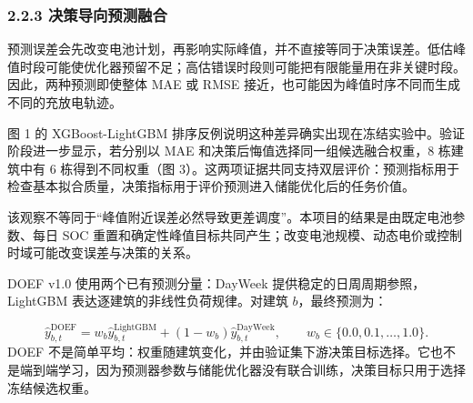 \documentclass[12pt,a4paper]{article}
\begin{document}
\subsubsection{2.2.3 决策导向预测融合}
预测误差会先改变电池计划，再影响实际峰值，并不直接等同于决策误差。低估峰值时段可能使优化器预留不足；高估错误时段则可能把有限能量用在非关键时段。因此，两种预测即使整体 MAE 或 RMSE 接近，也可能因为峰值时序不同而生成不同的充放电轨迹。\par
图 1 的 XGBoost-LightGBM 排序反例说明这种差异确实出现在冻结实验中。验证阶段进一步显示，若分别以 MAE 和决策后悔值选择同一组候选融合权重，8 栋建筑中有 6 栋得到不同权重（图 3）。这两项证据共同支持双层评价：预测指标用于检查基本拟合质量，决策指标用于评价预测进入储能优化后的任务价值。\par
该观察不等同于“峰值附近误差必然导致更差调度”。本项目的结果是由既定电池参数、每日 SOC 重置和确定性峰值目标共同产生；改变电池规模、动态电价或控制时域可能改变误差与决策的关系。\par
DOEF v1.0 使用两个已有预测分量：DayWeek 提供稳定的日周周期参照，LightGBM 表达逐建筑的非线性负荷规律。对建筑 \(b\)，最终预测为：\par
\[
\hat{y}_{b,t}^{\text{DOEF}}
=w_b\hat{y}_{b,t}^{\text{LightGBM}}
+(1-w_b)\hat{y}_{b,t}^{\text{DayWeek}},
\qquad w_b\in\{0.0,0.1,\ldots,1.0\}.
\]
DOEF 不是简单平均：权重随建筑变化，并由验证集下游决策目标选择。它也不是端到端学习，因为预测器参数与储能优化器没有联合训练，决策目标只用于选择冻结候选权重。\par
\end{document}
